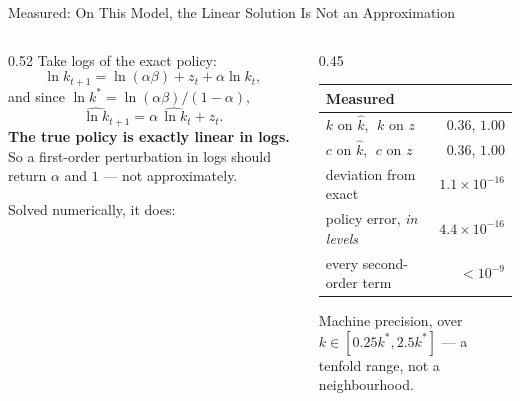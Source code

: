 \begin{frame}{Measured: On This Model, the Linear Solution Is Not an Approximation}
\begin{columns}[T]
\begin{column}{0.52\textwidth}
\small
Take logs of the exact policy:
\[
  \ln k_{t+1}=\ln(\alpha\beta)+z_t+\alpha\ln k_t ,
\]
and since $\ln k^{*}=\ln(\alpha\beta)/(1-\alpha)$,
\[
  \widehat{\ln k}_{t+1}=\alpha\,\widehat{\ln k}_{t}+z_t .
\]
\textbf{The true policy is exactly linear in logs.} So a first-order perturbation in logs should return $\alpha$ and $1$ --- not approximately.
\medskip

Solved numerically, it does:
\end{column}
\begin{column}{0.45\textwidth}
\begin{center}\footnotesize
\begin{tabularx}{\linewidth}{@{}>{\raggedright\arraybackslash}X r@{}}
\toprule
\textbf{Measured} & \\
\midrule
$k$ on $\hat{k}$, $\;k$ on $z$ & $0.36$,\; $1.00$ \\
$c$ on $\hat{k}$, $\;c$ on $z$ & $0.36$,\; $1.00$ \\
deviation from exact & $1.1\times10^{-16}$ \\
policy error, \emph{in levels} & $4.4\times10^{-16}$ \\
every second-order term & $<10^{-9}$ \\
\bottomrule
\end{tabularx}
\end{center}
\medskip
\begin{takeawaybox}\footnotesize
Machine precision, over $k\in[0.25k^{*},2.5k^{*}]$ --- a tenfold range, not a neighbourhood.
\end{takeawaybox}
\end{column}
\end{columns}
\vspace{1mm}
\end{frame}

